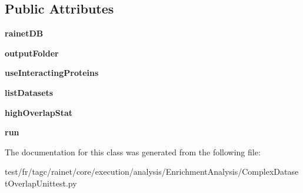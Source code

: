 \subsection*{Public Attributes}
\begin{DoxyCompactItemize}
\item 
\hypertarget{classComplexDatasetOverlapUnittest_1_1ComplexDatasetOverlapUnittest_ac97001e0c6b4e2c48b7edb2b696464fe}{{\bfseries rainet\-D\-B}}\label{classComplexDatasetOverlapUnittest_1_1ComplexDatasetOverlapUnittest_ac97001e0c6b4e2c48b7edb2b696464fe}

\item 
\hypertarget{classComplexDatasetOverlapUnittest_1_1ComplexDatasetOverlapUnittest_a9a3810558e594203613a63da0aab5988}{{\bfseries output\-Folder}}\label{classComplexDatasetOverlapUnittest_1_1ComplexDatasetOverlapUnittest_a9a3810558e594203613a63da0aab5988}

\item 
\hypertarget{classComplexDatasetOverlapUnittest_1_1ComplexDatasetOverlapUnittest_aaddfc23d86b63fe554070a78267e5e8c}{{\bfseries use\-Interacting\-Proteins}}\label{classComplexDatasetOverlapUnittest_1_1ComplexDatasetOverlapUnittest_aaddfc23d86b63fe554070a78267e5e8c}

\item 
\hypertarget{classComplexDatasetOverlapUnittest_1_1ComplexDatasetOverlapUnittest_a4db5ea8855111d8af8770f113c8f544c}{{\bfseries list\-Datasets}}\label{classComplexDatasetOverlapUnittest_1_1ComplexDatasetOverlapUnittest_a4db5ea8855111d8af8770f113c8f544c}

\item 
\hypertarget{classComplexDatasetOverlapUnittest_1_1ComplexDatasetOverlapUnittest_a0df45e97cbe1d1fa77bc87150637961b}{{\bfseries high\-Overlap\-Stat}}\label{classComplexDatasetOverlapUnittest_1_1ComplexDatasetOverlapUnittest_a0df45e97cbe1d1fa77bc87150637961b}

\item 
\hypertarget{classComplexDatasetOverlapUnittest_1_1ComplexDatasetOverlapUnittest_aafff157880bf8b16fe1c929f03693c12}{{\bfseries run}}\label{classComplexDatasetOverlapUnittest_1_1ComplexDatasetOverlapUnittest_aafff157880bf8b16fe1c929f03693c12}

\end{DoxyCompactItemize}


The documentation for this class was generated from the following file\-:\begin{DoxyCompactItemize}
\item 
test/fr/tagc/rainet/core/execution/analysis/\-Enrichment\-Analysis/Complex\-Dataset\-Overlap\-Unittest.\-py\end{DoxyCompactItemize}
